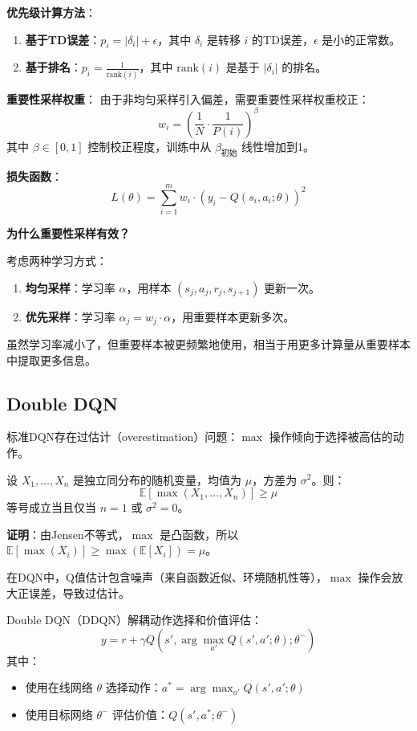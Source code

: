 \textbf{优先级计算方法}：
\begin{enumerate}
    \item \textbf{基于TD误差}：$p_i = |\delta_i| + \epsilon$，其中 $\delta_i$ 是转移 $i$ 的TD误差，$\epsilon$ 是小的正常数。
    \item \textbf{基于排名}：$p_i = \frac{1}{\text{rank}(i)}$，其中 $\text{rank}(i)$ 是基于 $|\delta_i|$ 的排名。
\end{enumerate}

\textbf{重要性采样权重}：
由于非均匀采样引入偏差，需要重要性采样权重校正：
\[
w_i = \left( \frac{1}{N} \cdot \frac{1}{P(i)} \right)^{\beta}
\]
其中 $\beta \in [0, 1]$ 控制校正程度，训练中从 $\beta_{\text{初始}}$ 线性增加到1。

\textbf{损失函数}：
\[
L(\theta) = \sum_{i=1}^{m} w_i \cdot (y_i - Q(s_i, a_i; \theta))^2
\]

\textbf{为什么重要性采样有效？}

考虑两种学习方式：
\begin{enumerate}
    \item \textbf{均匀采样}：学习率 $\alpha$，用样本 $(s_j, a_j, r_j, s_{j+1})$ 更新一次。
    \item \textbf{优先采样}：学习率 $\alpha_j = w_j \cdot \alpha$，用重要样本更新多次。
\end{enumerate}

虽然学习率减小了，但重要样本被更频繁地使用，相当于用更多计算量从重要样本中提取更多信息。

\subsection{Double DQN}

标准DQN存在过估计（overestimation）问题：$\max$ 操作倾向于选择被高估的动作。

\begin{theorem}[过估计定理]
设 $X_1, \ldots, X_n$ 是独立同分布的随机变量，均值为 $\mu$，方差为 $\sigma^2$。则：
\[
\mathbb{E}[\max(X_1, \ldots, X_n)] \geq \mu
\]
等号成立当且仅当 $n=1$ 或 $\sigma^2=0$。
\end{theorem}

\textbf{证明}：由Jensen不等式，$\max$ 是凸函数，所以 $\mathbb{E}[\max(X_i)] \geq \max(\mathbb{E}[X_i]) = \mu$。

在DQN中，Q值估计包含噪声（来自函数近似、环境随机性等），$\max$ 操作会放大正误差，导致过估计。

\begin{definition}
Double DQN（DDQN）解耦动作选择和价值评估：
\[
y = r + \gamma Q\left(s', \arg\max_{a'} Q(s', a'; \theta); \theta^-\right)
\]
其中：
\begin{itemize}
    \item 使用在线网络 $\theta$ 选择动作：$a^* = \arg\max_{a'} Q(s', a'; \theta)$
    \item 使用目标网络 $\theta^-$ 评估价值：$Q(s', a^*; \theta^-)$
\end{itemize}
\end{definition}

